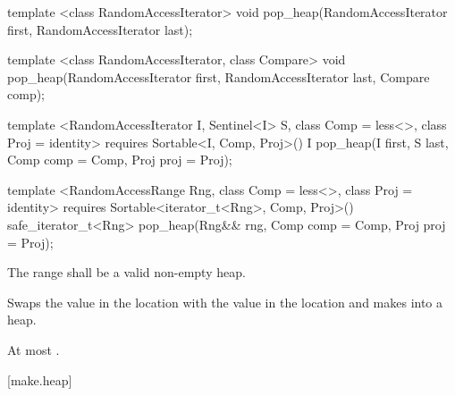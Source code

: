 %
\begin{removedblock}
\begin{itemdecl}
template <class RandomAccessIterator>
  void pop_heap(RandomAccessIterator first, RandomAccessIterator last);

template <class RandomAccessIterator, class Compare>
  void pop_heap(RandomAccessIterator first, RandomAccessIterator last,
                Compare comp);
\end{itemdecl}
\end{removedblock}
\begin{addedblock}
\begin{itemdecl}
template <RandomAccessIterator I, Sentinel<I> S, class Comp = less<>,
    class Proj = identity>
  requires Sortable<I, Comp, Proj>()
  I pop_heap(I first, S last, Comp comp = Comp{}, Proj proj = Proj{});

template <RandomAccessRange Rng, class Comp = less<>, class Proj = identity>
  requires Sortable<iterator_t<Rng>, Comp, Proj>()
  safe_iterator_t<Rng>
    pop_heap(Rng&& rng, Comp comp = Comp{}, Proj proj = Proj{});
\end{itemdecl}
\end{addedblock}

\begin{itemdescr}
\pnum
\requires
The range
shall be a valid non-empty heap.

\pnum
\effects
Swaps the value in the location 
with the value in the location
and makes
into a heap.

\begin{addedblock}
\pnum
\returns {}
\end{addedblock}

\pnum
\complexity
At most
.
\end{itemdescr}

[make.heap]{}

